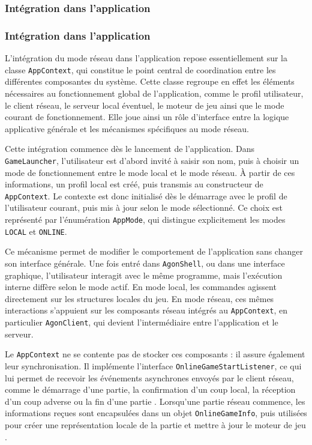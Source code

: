 \documentclass[a4paper]{article}
\begin{document}
\subsubsection{Intégration dans l'application}


\subsubsection{Intégration dans l'application}

L’intégration du mode réseau dans l’application repose essentiellement sur la classe \texttt{AppContext}, qui constitue le point central de coordination entre les différentes composantes du système. Cette classe regroupe en effet les éléments nécessaires au fonctionnement global de l’application, comme le profil utilisateur, le client réseau, le serveur local éventuel, le moteur de jeu ainsi que le mode courant de fonctionnement. Elle joue ainsi un rôle d’interface entre la logique applicative générale et les mécanismes spécifiques au mode réseau.

Cette intégration commence dès le lancement de l’application. Dans \texttt{GameLauncher}, l’utilisateur est d’abord invité à saisir son nom, puis à choisir un mode de fonctionnement entre le mode local et le mode réseau. À partir de ces informations, un profil local est créé, puis transmis au constructeur de \texttt{AppContext}. Le contexte est donc initialisé dès le démarrage avec le profil de l’utilisateur courant, puis mis à jour selon le mode sélectionné. Ce choix est représenté par l’énumération \texttt{AppMode}, qui distingue explicitement les modes \texttt{LOCAL} et \texttt{ONLINE}.

Ce mécanisme permet de modifier le comportement de l’application sans changer son interface générale. Une fois entré dans \texttt{AgonShell}, ou dans une interface graphique, l’utilisateur interagit avec le même programme, mais l’exécution interne diffère selon le mode actif. En mode local, les commandes agissent directement sur les structures locales du jeu. En mode réseau, ces mêmes interactions s’appuient sur les composants réseau intégrés au \texttt{AppContext}, en particulier \texttt{AgonClient}, qui devient l’intermédiaire entre l’application et le serveur.

Le \texttt{AppContext} ne se contente pas de stocker ces composants : il assure également leur synchronisation. Il implémente l’interface \texttt{OnlineGameStartListener}, ce qui lui permet de recevoir les événements asynchrones envoyés par le client réseau, comme le démarrage d’une partie, la confirmation d’un coup local, la réception d’un coup adverse ou la fin d’une partie . Lorsqu’une partie réseau commence, les informations reçues sont encapsulées dans un objet \texttt{OnlineGameInfo}, puis utilisées pour créer une représentation locale de la partie et mettre à jour le moteur de jeu .
\end{document}
